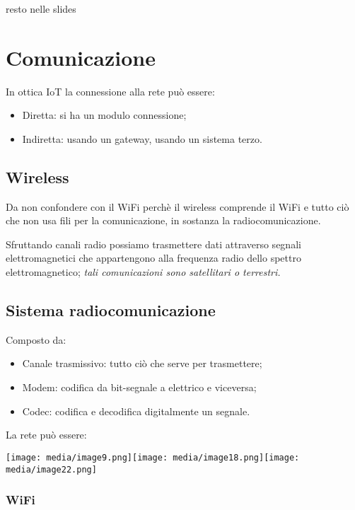 resto nelle slides

\section{Comunicazione}\label{comunicazione}

In ottica IoT la connessione alla rete può essere:

\begin{itemize}
\item
  Diretta: si ha un modulo connessione;
\item
  Indiretta: usando un gateway, usando un sistema terzo.
\end{itemize}

\subsection{Wireless}\label{wireless}

Da non confondere con il WiFi perchè il wireless comprende il WiFi e
tutto ciò che non usa fili per la comunicazione, in sostanza la
radiocomunicazione.

Sfruttando canali radio possiamo trasmettere dati attraverso segnali
elettromagnetici che appartengono alla frequenza radio dello spettro
elettromagnetico; \emph{tali comunicazioni sono satellitari o
terrestri.}

\subsection{Sistema
radiocomunicazione}\label{sistema-radiocomunicazione}

Composto da:

\begin{itemize}
\item
  Canale trasmissivo: tutto ciò che serve per trasmettere;
\item
  Modem: codifica da bit-segnale a elettrico e viceversa;
\item
  Codec: codifica e decodifica digitalmente un segnale.
\end{itemize}

La rete può essere:

\texttt{[image: media/image9.png]}\texttt{[image: media/image18.png]}\texttt{[image: media/image22.png]}

\subsubsection{WiFi}\label{wifi}

